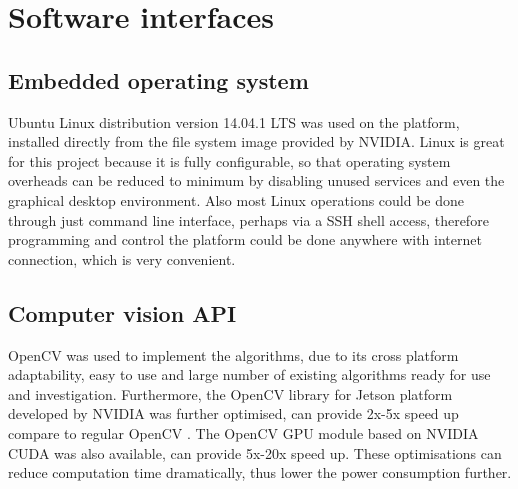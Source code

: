 \section{Software interfaces}

\subsection{Embedded operating system}

Ubuntu Linux distribution version 14.04.1 LTS was used on the platform, installed directly from the file system image provided by NVIDIA. Linux is great for this project because it is fully configurable, so that operating system overheads can be reduced to minimum by disabling unused services and even the graphical desktop environment. Also most Linux operations could be done through just command line interface, perhaps via a SSH shell access, therefore programming and control the platform could be done anywhere with internet connection, which is very convenient.

\subsection{Computer vision API}

OpenCV \cite{opencv} was used to implement the algorithms, due to its cross platform adaptability, easy to use and large number of existing algorithms ready for use and investigation. Furthermore, the OpenCV library for Jetson platform developed by NVIDIA was further optimised, can provide 2x-5x speed up compare to regular OpenCV \cite{NVIDIA:perf}. The OpenCV GPU module based on NVIDIA CUDA was also available, can provide 5x-20x speed up. These optimisations can reduce computation time dramatically, thus lower the power consumption further.
